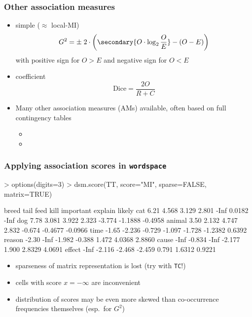 \documentclass[t]{beamer} %
\begin{document}
\begin{frame}
  \frametitle{Other association measures}

  \begin{itemize}
  \item simple  ($\approx$ local-MI)
    \[
    G^2 = \pm\; 2\cdot \left( \secondary{O\cdot \log_2 \frac{O}{E}} - (O - E) \right)
    \]
    with positive sign for $O > E$ and negative sign for $O < E$
  \item<2->  coefficient
    \[
      \text{Dice} = \frac{2 O}{R + C}
    \]
    \gap
  \item<3-> Many other association measures (AMs) available, often based on
    full contingency tables \citep[see][]{Evert:08}
    \begin{itemize}
    \item {}
    \item {}
    \end{itemize}
  \end{itemize}
\end{frame}

\begin{frame}[fragile]
  \frametitle{Applying association scores in \texttt{wordspace}}

\ungap[1]
\begin{Rcode}
> options(digits=3) 
> dsm.score(TT, score="MI", sparse=FALSE, matrix=TRUE)\begin{Rout}
       breed   tail   feed   kill important explain  likely
cat     6.21  4.568  3.129  2.801      -Inf  0.0182    -Inf
dog     7.78  3.081  3.922  2.323    -3.774 -1.1888 -0.4958
animal  3.50  2.132  4.747  2.832    -0.674 -0.4677 -0.0966
time   -1.65 -2.236 -0.729 -1.097    -1.728 -1.2382  0.6392
reason -2.30   -Inf -1.982 -0.388     1.472  4.0368  2.8860
cause   -Inf -0.834   -Inf -2.177     1.900  2.8329  4.0691
effect  -Inf -2.116 -2.468 -2.459     0.791  1.6312  0.9221\end{Rout}
\end{Rcode}

\begin{itemize}
\item<2->[\hand] sparseness of matrix representation is lost (try with \texttt{TC}!)
\item<2->[\hand] cells with score $x = -\infty$ are inconvenient
\item<2->[\hand] distribution of scores may be even more skewed than co-occurrence frequencies themselves (esp.\ for $G^2$)
\end{itemize}
\end{frame}
\end{document}
